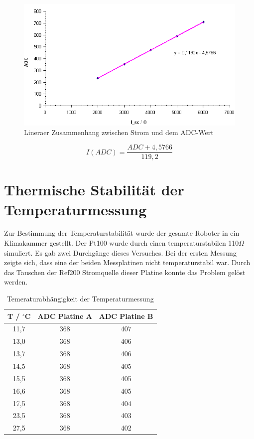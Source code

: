 \documentclass[a4paper,bibtotoc,oneside]{scrbook}
\begin{document}
\begin{figure}[htbp]
\centering
\includegraphics[width=150mm]{img/16grad.png}
\caption{Lineraer Zusammenhang zwischen Strom und dem ADC-Wert}\label{ical}
\end{figure}

\begin{equation}
     I(ADC) = \frac{ADC + 4,5766} {119,2} 
\end{equation}
  


\section{Thermische Stabilität der Temperaturmessung}\thispagestyle{empty}
Zur Bestimmung der Temperaturstabilität wurde der gesamte Roboter in ein Klimakammer gestellt. Der Pt100 wurde durch einen temperaturstabilen 110$\Omega$ simuliert.
Es gab zwei Durchgänge dieses Versuches.
Bei der ersten Messung zeigte sich, dass eine der beiden Messplatinen nicht temperaturstabil war. Durch das Tauschen der Ref200 Stromquelle dieser Platine konnte das Problem gelöst werden.

\begin{table}[htbp]
\centering
\begin{tabular}{ | c | c | c |}\hline
{\bf T / $^{\circ}$C} & {\bf ADC Platine A} & {\bf ADC Platine B}\\ \hline
\hline
11,7 & 368 & 407\\ \hline
13,0 & 368 & 406\\ \hline
13,7 & 368 & 406\\ \hline
14,5 & 368 & 405\\ \hline
15,5 & 368 & 405\\ \hline
16,6 & 368 & 405\\ \hline
17,5 & 368 & 404\\ \hline
23,5 & 368 & 403\\ \hline
27,5 & 368 & 402\\ \hline
\end{tabular}
\caption{Temeraturabhängigkeit der Temperaturmessung}\label{TabT1}
\end{table}
\end{document}
